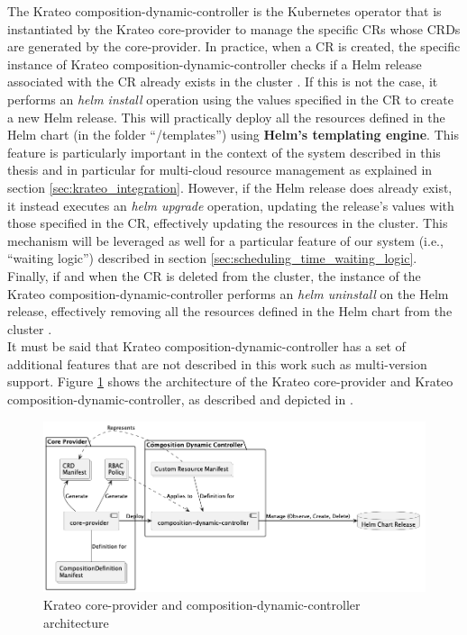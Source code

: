 The Krateo composition-dynamic-controller is the Kubernetes operator that is instantiated by the Krateo core-provider to manage the specific CRs whose CRDs are generated by the core-provider.
In practice, when a CR is created, the specific instance of Krateo composition-dynamic-controller checks if a Helm release associated with the CR already exists in the cluster \cite{krateo_composition_dynamic_controller}. 
If this is not the case, it performs an \textit{helm install} operation using the values specified in the CR to create a new Helm release. 
This will practically deploy all the resources defined in the Helm chart (in the folder ``/templates'') using \textbf{Helm's templating engine}.
This feature is particularly important in the context of the system described in this thesis and in particular for multi-cloud resource management as explained in section \ref{sec:krateo_integration}.
However, if the Helm release does already exist, it instead executes an \textit{helm upgrade} operation, updating the release's values with those specified in the CR, effectively updating the resources in the cluster.
This mechanism will be leveraged as well for a particular feature  of our system (i.e., ``waiting logic'') described in section \ref{sec:scheduling_time_waiting_logic}.
Finally, if and when the CR is deleted from the cluster, the instance of the Krateo composition-dynamic-controller performs an \textit{helm uninstall} on the Helm release, effectively removing all the resources defined in the Helm chart from the cluster \cite{krateo_composition_dynamic_controller}. \\

It must be said that Krateo composition-dynamic-controller has a set of additional features that are not described in this work such as multi-version support.
Figure \ref{fig:krateo_core_provider} shows the architecture of the Krateo core-provider and Krateo composition-dynamic-controller, as described and depicted in \cite{krateo_core_provider}.

\begin{figure}[t]
    \centering
    \includegraphics[width=1\linewidth]{images/kraeto_core_provider.png}
    \caption{Krateo core-provider and composition-dynamic-controller architecture \cite{krateo_core_provider}}
    \label{fig:krateo_core_provider}
\end{figure}

